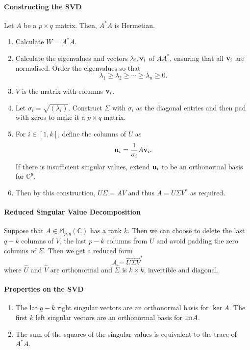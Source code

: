 \paragraph{Constructing the SVD}

Let \( A \) be a \( p \times q \) matrix.  Then, \( A^* A  \) is Hermetian.

\begin{enumerate}
    \item Calculate \( W = A^* A \).
    \item Calculate the eigenvalues and vectors \( \lambda_i, \mathbf{v}_i \)
        of \( A A^* \), ensuring that all \( \mathbf{v}_i \) are normalised.
        Order the eigenvalues so that \[
            \lambda_1 \geq \lambda_2 \geq\cdots \geq \lambda_n \geq 0
        .\]
    \item \( V \) is the matrix with columns \( \mathbf{v}_i \).
    \item Let \( \sigma_i = \sqrt{(\lambda_i)} \). Construct \( \Sigma \)
        with \( \sigma_i \) as the diagonal entries and then pad
        with zeros to make it a \( p \times q \) matrix.
    \item For \( i \in [1, k] \), define the columns of \( U \) as \[
        \mathbf{u}_i = \frac{1}{\sigma_i} A \mathbf{v}_i
    .\]
    If there is insufficient singular values, extend \( \mathbf{u}_i \)
    to be an orthonormal basis for \( \mathbb{C}^p \).
    \item Then by this construction, \( U \Sigma = A V \) and thus
        \( A = U \Sigma V^* \) as required.
\end{enumerate}

\paragraph{Reduced Singular Value Decomposition}
Suppose that \( A \in \mathbb{M}_{p, q} (\mathbb{C}) \)
has a rank \( k \). Then we can choose to delete the last
\( q - k \) columns of \( V \), the last \( p - k \) columns
from \( U \) and avoid padding the zero columns of \( \Sigma \).
Then we get a reduced form \[
    A = \hat{U} \hat{\Sigma} \hat{V}^*
\]
where \( \hat{U} \) and \( \hat{V} \) are orthonormal
and \( \hat{\Sigma} \) is \( k\times k \), invertible
and diagonal.

\paragraph{Properties on the SVD}
\begin{enumerate}
    \item The lat \( q - k \) right singular vectors
    are an orthonormal basis for \( \ker A \).
    The first \( k \) left singular vectors are an orthonormal
    basis for \( \mathrm{im} A \).
    \item The sum of the squares of the singular values is
    equivalent to the trace of \( A^* A \).
\end{enumerate}

